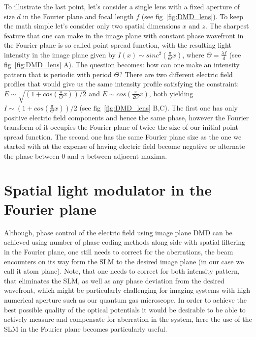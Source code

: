 To illustrate the last point, let's consider a single lens with a fixed aperture of size $d$ in the Fourier plane and focal length $f$ (see fig~\ref{fig:DMD_lens}). To keep the math simple let's consider only two spatial dimensions $x$ and $z$. The sharpest feature that one can make in the image plane with constant phase wavefront in the Fourier plane is so called point spread function, with the resulting light intensity in the image plane given by $I(x) \sim sinc^2(\frac{\pi}{\Theta} x)$, where $\Theta = \frac{\lambda f}{d}$ (see fig~\ref{fig:DMD_lens} A). The question becomes: how can one make an intensity pattern that is periodic with period $\Theta$? There are two different electric field profiles that would give us the same intensity profile satisfying the constraint: $E \sim \sqrt{(1+cos(\frac{\pi}{\Theta}x))/2}$ and $E \sim cos(\frac{\pi}{2\Theta} x)$, both yielding $I \sim (1+cos(\frac{\pi}{\Theta}x))/2$ (see fig~\ref{fig:DMD_lens} B,C). The first one has only positive electric field components and hence the same phase, however the Fourier transform of it occupies the Fourier plane of twice the size of our initial point spread function. The second one has the same Fourier plane size as the one we started with at the expense of having electric field become negative or alternate the phase between $0$ and $\pi$ between adjacent maxima.

\section{Spatial light modulator in the Fourier plane}
Although, phase control of the electric field using image plane DMD can be achieved using number of phase coding methods \cite{Lee1970, Goorden2014} along side with spatial filtering in the Fourier plane, one still needs to correct for the aberrations, the beam encounters on its way form the SLM to the desired image plane (in our case we call it atom plane). Note, that one needs to correct for both intensity pattern, that eliminates the SLM, as well as any phase deviation from the desired wavefront, which might be particularly challenging for imaging systems with high numerical aperture such as our quantum gas microscope. In order to achieve the best possible quality of the optical potentials it would be desirable to be able to actively measure and compensate for aberration in the system, here the use of the SLM in the Fourier plane becomes particularly useful.

 

